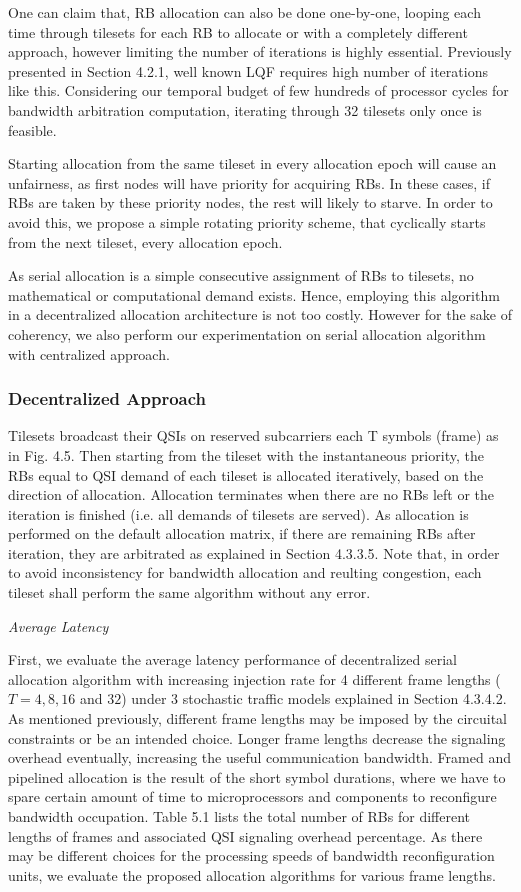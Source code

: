 One can claim that, RB allocation can also be done one-by-one, looping each time through tilesets for each RB to allocate or with a completely different approach, however limiting the number of iterations is highly essential. Previously presented in Section 4.2.1, well known LQF requires high number of iterations like this. Considering our temporal budget of few hundreds of processor cycles for bandwidth arbitration computation, iterating through 32 tilesets only once is feasible.  

Starting allocation from the same tileset in every allocation epoch will cause an unfairness, as first nodes will have priority for acquiring RBs. In these cases, if RBs are taken by these priority nodes, the rest will likely to starve. In order to avoid this, we propose a simple rotating priority scheme, that cyclically starts from the next tileset, every allocation epoch. 

As serial allocation is a simple consecutive assignment of RBs to tilesets, no mathematical or computational demand exists. Hence, employing this algorithm in a decentralized allocation architecture is not too costly. However for the sake of coherency, we also perform our experimentation on serial allocation algorithm with centralized approach. 

\subsubsection{Decentralized Approach}

Tilesets broadcast their QSIs on reserved subcarriers each T symbols (frame) as in Fig. 4.5. Then starting from the tileset with the instantaneous priority, the RBs equal to QSI demand of each tileset is allocated iteratively, based on the direction of allocation. Allocation terminates when there are no RBs left or the iteration is finished (i.e. all demands of tilesets are served). As allocation is performed on the default allocation matrix, if there are remaining RBs after iteration, they are arbitrated as explained in Section 4.3.3.5. Note that, in order to avoid inconsistency for bandwidth allocation and reulting congestion, each tileset shall perform the same algorithm without any error.
  
\textit{Average Latency}


First, we evaluate the average latency performance of decentralized serial allocation algorithm with increasing injection rate for 4 different frame lengths ($T=4, 8, 16$ and $32$) under 3 stochastic traffic models explained in Section 4.3.4.2. As mentioned previously, different frame lengths may be imposed by the circuital constraints or be an intended choice. Longer frame lengths decrease the signaling overhead eventually, increasing the useful communication bandwidth. Framed and pipelined allocation is the result of the short symbol durations, where we have to spare certain amount of time to microprocessors and components to reconfigure bandwidth occupation. Table 5.1 lists the total number of RBs for different lengths of frames and associated QSI signaling overhead percentage. As there may be different choices for the processing speeds of bandwidth reconfiguration units, we evaluate the proposed allocation algorithms for various frame lengths.   


